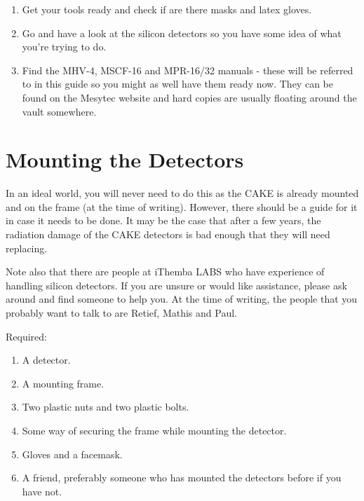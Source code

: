\documentclass[11pt]{report}
\begin{document}
\begin{enumerate}
 \item Get your tools ready and check if are there masks and latex gloves.
 \item Go and have a look at the silicon detectors so you have some idea of what you're trying to do.
 \item Find the MHV-4, MSCF-16 and MPR-16/32 manuals - these will be referred to in this guide so you might as well have them ready now. They can be found on the Mesytec website and hard copies are usually floating around the vault somewhere.
\end{enumerate}

\section{Mounting the Detectors}
In an ideal world, you will never need to do this as the CAKE is already mounted and on the frame (at the time of writing). However, there should be a guide for it in case it needs to be done. It may be the case that after a few years, the radiation damage of the CAKE detectors is bad enough that they will need replacing.

Note also that there are people at iThemba LABS who have experience of handling silicon detectors. If you are unsure or would like assistance, please ask around and find someone to help you. At the time of writing, the people that you probably want to talk to are Retief, Mathis and Paul.

Required:
\begin{enumerate}
 \item A detector.
 \item A mounting frame.
 \item Two plastic nuts and two plastic bolts.
 \item Some way of securing the frame while mounting the detector.
 \item Gloves and a facemask.
 \item A friend, preferably someone who has mounted the detectors before if you have not.
\end{enumerate}
\end{document}
